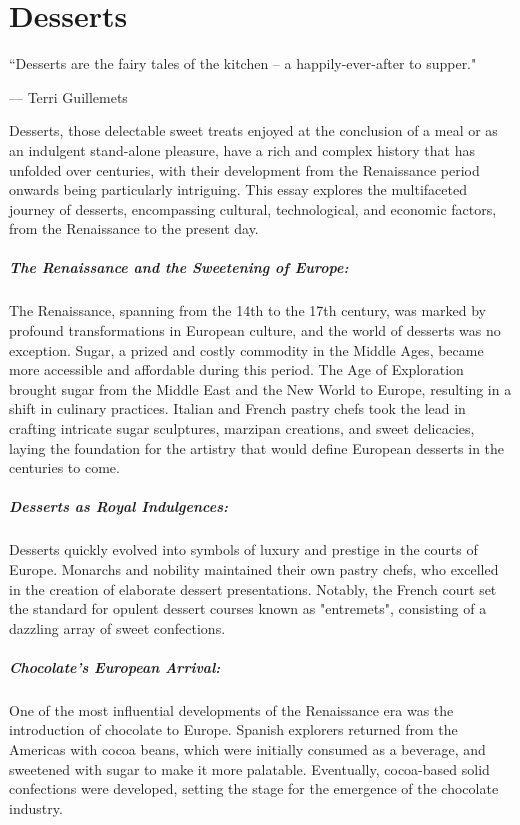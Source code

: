 \chapter{Desserts}
\label{desserts}
\epigraph{``Desserts are the fairy tales of the kitchen -- a happily-ever-after to supper."}{--- \textup{Terri Guillemets}}

Desserts, those delectable sweet treats enjoyed at the conclusion of a meal or as an indulgent stand-alone pleasure, have a rich and complex history that has unfolded over centuries, with their development from the Renaissance period onwards being particularly intriguing. This essay explores the multifaceted journey of desserts, encompassing cultural, technological, and economic factors, from the Renaissance to the present day.

\paragraph{The Renaissance and the Sweetening of Europe:} The Renaissance, spanning from the 14th to the 17th century, was marked by profound transformations in European culture, and the world of desserts was no exception. Sugar, a prized and costly commodity in the Middle Ages, became more accessible and affordable during this period. The Age of Exploration brought sugar from the Middle East and the New World to Europe, resulting in a shift in culinary practices. Italian and French pastry chefs took the lead in crafting intricate sugar sculptures, marzipan creations, and sweet delicacies, laying the foundation for the artistry that would define European desserts in the centuries to come.

\paragraph{Desserts as Royal Indulgences:} Desserts quickly evolved into symbols of luxury and prestige in the courts of Europe. Monarchs and nobility maintained their own pastry chefs, who excelled in the creation of elaborate dessert presentations. Notably, the French court set the standard for opulent dessert courses known as "entremets", consisting of a dazzling array of sweet confections.

\paragraph{Chocolate's European Arrival:} One of the most influential developments of the Renaissance era was the introduction of chocolate to Europe. Spanish explorers returned from the Americas with cocoa beans, which were initially consumed as a beverage, and sweetened with sugar to make it more palatable. Eventually, cocoa-based solid confections were developed, setting the stage for the emergence of the chocolate industry.

